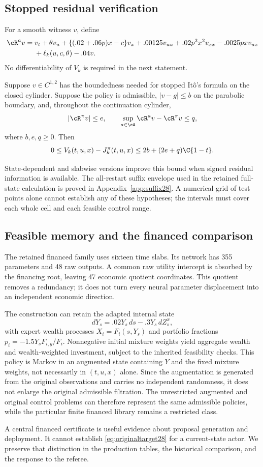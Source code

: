\subsection{Stopped residual verification}
For a smooth witness $v$, define
\begin{align}\label{eq:residual28}
 \cR^a v={}&v_t+\theta v_u+\{(.02+.06p)x-c\}v_x+.00125v_{uu}
 +.02p^2x^2v_{xx}-.0025pxv_{ux}\\
 &+\ell_k(u,c,\theta)-.04v.\nonumber
\end{align}
No differentiability of $V_k$ is required in the next statement.
\begin{proposition}\label{prop:residual28}
Suppose $v\in C^{1,2}$ has the boundedness needed for stopped It\^o's formula on the closed cylinder. Suppose the policy is admissible, $|v-g|\le b$ on the parabolic boundary, and, throughout the continuation cylinder,
\begin{equation}
 |\cR^\pi v|\le e,\qquad \sup_{a\in\cA}\cR^av-\cR^\pi v\le q,
\end{equation}
where $b,e,q\ge0$. Then
\begin{equation}\label{eq:uniformcertificate28}
 0\le V_k(t,u,x)-J_k^\pi(t,u,x)\le 2b+(2e+q)\C{1-t}.
\end{equation}
\end{proposition}
State-dependent and slabwise versions improve this bound when signed residual information is available. The all-restart suffix envelope used in the retained full-state calculation is proved in Appendix~\ref{app:suffix28}. A numerical grid of test points alone cannot establish any of these hypotheses; the intervals must cover each whole cell and each feasible control range.

\subsection{Feasible memory and the financed comparison}
The retained financed family uses sixteen time slabs. Its network has 355 parameters and 48 raw outputs. A common raw utility intercept is absorbed by the financing root, leaving 47 economic quotient coordinates. This quotient removes a redundancy; it does not turn every neural parameter displacement into an independent economic direction.

The construction can retain the adapted internal state
\begin{equation}
 dY_s=.02Y_s\,ds-.3Y_s\,dZ^x_s,
\end{equation}
with expert wealth processes $X_i=F_i(s,Y_s)$ and portfolio fractions $p_i=-1.5Y_s F_{i,y}/F_i$. Nonnegative initial mixture weights yield aggregate wealth and wealth-weighted investment, subject to the inherited feasibility checks. This policy is Markov in an augmented state containing $Y$ and the fixed mixture weights, not necessarily in $(t,u,x)$ alone. Since the augmentation is generated from the original observations and carries no independent randomness, it does not enlarge the original admissible filtration. The unrestricted augmented and original control problems can therefore represent the same admissible policies, while the particular finite financed library remains a restricted class.

A central financed certificate is useful evidence about proposal generation and deployment. It cannot establish \eqref{eq:originaltarget28} for a current-state actor. We preserve that distinction in the production tables, the historical comparison, and the response to the referee.
